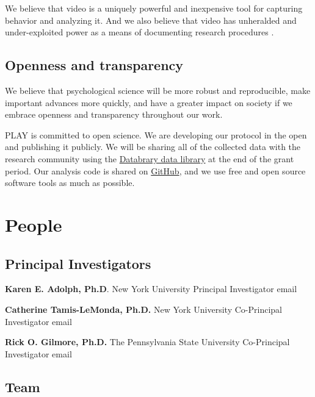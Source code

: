 \documentclass[
  12pt,
]{book}
\begin{document}
We believe that video is a uniquely powerful and inexpensive tool for capturing behavior and analyzing it. And we also believe that video has unheralded and under-exploited power as a means of documenting research procedures \citep{Adolph_KE_Gilmore_RO_Kennedy_JL2017-va, Gilmore2017-wd}.

\hypertarget{openness}{%
\subsection*{Openness and transparency}\label{openness}}

We believe that psychological science will be more robust and reproducible, make important advances more quickly, and have a greater impact on society if we embrace openness and transparency throughout our work.

PLAY is committed to open science. We are developing our protocol in the open and publishing it publicly. We will be sharing all of the collected data with the research community using the \href{https://databrary.org}{Databrary data library} at the end of the grant period. Our analysis code is shared on \href{https://github.com/PLAY-behaviorome}{GitHub}, and we use free and open source software tools as much as possible.

\hypertarget{people}{%
\section*{People}\label{people}}

\hypertarget{pis}{%
\subsection*{Principal Investigators}\label{pis}}

\textbf{Karen E. Adolph, Ph.D}.
New York University
Principal Investigator
email

\textbf{Catherine Tamis-LeMonda, Ph.D.}
New York University
Co-Principal Investigator
email

\textbf{Rick O. Gilmore, Ph.D.}
The Pennsylvania State University
Co-Principal Investigator
email

\hypertarget{staff}{%
\subsection*{Team}\label{staff}}
\end{document}
